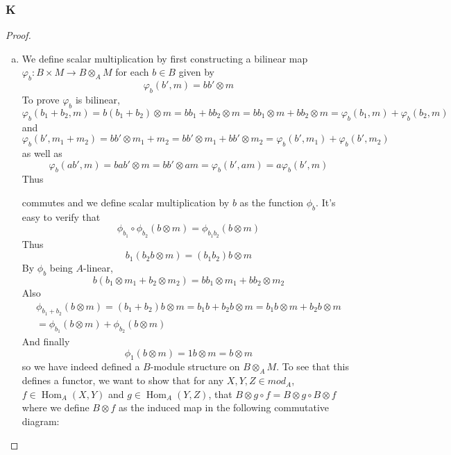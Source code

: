\documentclass{article}
\DeclareMathOperator{\Hom}{\mathrm{Hom}}
\begin{document}
\subsubsection{K}\label{1.3.K}
\begin{proof}
    \begin{enumerate}[(a)]
        \item 

        We define scalar multiplication by first constructing a bilinear map $\varphi_b:B\times M\to B\otimes_A M$ for each $b\in B$ given by 
    \[
    \varphi_b(b',m)=bb'\otimes m
    \]
    To prove $\varphi_b$ is bilinear,
    \[
    \varphi_b(b_1+b_2,m)=b(b_1+b_2)\otimes m=bb_1+bb_2\otimes m=bb_1\otimes m+bb_2\otimes m=\varphi_b(b_1,m)+\varphi_b(b_2,m)
    \]
    and
    \[
    \varphi_b(b',m_1+m_2)=bb'\otimes m_1+m_2=bb'\otimes m_1+bb'\otimes m_2=\varphi_b(b',m_1)+\varphi_b(b',m_2)
    \]
    as well as
    \[
    \varphi_b(ab',m)=bab'\otimes m=bb'\otimes am=\varphi_b(b',am)=a\varphi_b(b',m)
    \]
    Thus
    \begin{center}
    \end{center}
    commutes and we define scalar multiplication by $b$ as the function $\phi_b$. It's easy to verify that
    \[
    \phi_{b_1}\circ \phi_{b_2}(b\otimes m)=\phi_{b_1b_2}(b\otimes m)
    \]
    Thus
    \[
    b_1(b_2 b\otimes m)=(b_1 b_2) b\otimes m
    \]
    By $\phi_b$ being $A$-linear,
    \[
    b(b_1\otimes m_1+b_2\otimes m_2)=b b_1\otimes m_1+b b_2\otimes m_2
    \]
    Also
    \begin{align*}
        \phi_{b_1+b_2}(b\otimes m)=(b_1+b_2)b\otimes m=b_1b+b_2b\otimes m=b_1b\otimes m+b_2b\otimes m\\
        =\phi_{b_1}(b\otimes m)+\phi_{b_2}(b\otimes m)
    \end{align*}
    And finally
    \[
    \phi_1(b\otimes m)=1b\otimes m=b\otimes m
    \]
    so we have indeed defined a $B$-module structure on $B\otimes_A M$. To see that this defines a functor, we want to show that for any $X,Y,Z\in mod_A$, $f\in \Hom_A(X,Y)$ and $g\in \Hom_A(Y,Z)$, that $B\otimes g\circ f=B\otimes g\circ B\otimes f$ where we define $B\otimes f$ as the induced map in the following commutative diagram:
    \begin{center}

\end{center}
\end{enumerate}
\end{proof}
\end{document}
